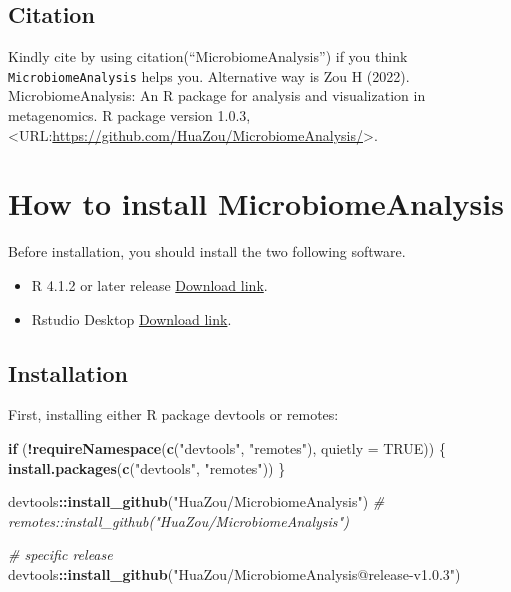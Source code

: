 \documentclass[
]{book}
\newenvironment{Shaded}{\begin{snugshade}}{\end{snugshade}}
\newcommand{\AttributeTok}[1]{\textcolor[rgb]{0.13,0.29,0.53}{#1}}
\newcommand{\CommentTok}[1]{\textcolor[rgb]{0.56,0.35,0.01}{\textit{#1}}}
\newcommand{\ConstantTok}[1]{\textcolor[rgb]{0.56,0.35,0.01}{#1}}
\newcommand{\ControlFlowTok}[1]{\textcolor[rgb]{0.13,0.29,0.53}{\textbf{#1}}}
\newcommand{\FunctionTok}[1]{\textcolor[rgb]{0.13,0.29,0.53}{\textbf{#1}}}
\newcommand{\NormalTok}[1]{#1}
\newcommand{\SpecialCharTok}[1]{\textcolor[rgb]{0.81,0.36,0.00}{\textbf{#1}}}
\newcommand{\StringTok}[1]{\textcolor[rgb]{0.31,0.60,0.02}{#1}}
\begin{document}
\hypertarget{citation}{%
\section{Citation}\label{citation}}

Kindly cite by using citation(``MicrobiomeAnalysis'') if you think \texttt{MicrobiomeAnalysis} helps you. Alternative way is Zou H (2022). MicrobiomeAnalysis: An R package for analysis and visualization in metagenomics. R package version 1.0.3, \textless URL:\url{https://github.com/HuaZou/MicrobiomeAnalysis/}\textgreater.

\hypertarget{how-to-install-microbiomeanalysis}{%
\chapter{How to install MicrobiomeAnalysis}\label{how-to-install-microbiomeanalysis}}

Before installation, you should install the two following software.

\begin{itemize}
\item
  R 4.1.2 \citep{R-base} or later release \href{https://mirrors.tuna.tsinghua.edu.cn/CRAN/}{Download link}.
\item
  Rstudio Desktop \href{https://www.rstudio.com/products/rstudio/download/\#download}{Download link}.
\end{itemize}

\hypertarget{installation}{%
\section{Installation}\label{installation}}

First, installing either R package devtools or remotes:

\begin{Shaded}
\begin{Highlighting}[]
\ControlFlowTok{if}\NormalTok{ (}\SpecialCharTok{!}\FunctionTok{requireNamespace}\NormalTok{(}\FunctionTok{c}\NormalTok{(}\StringTok{"devtools"}\NormalTok{, }\StringTok{"remotes"}\NormalTok{), }\AttributeTok{quietly =} \ConstantTok{TRUE}\NormalTok{)) \{}
  \FunctionTok{install.packages}\NormalTok{(}\FunctionTok{c}\NormalTok{(}\StringTok{"devtools"}\NormalTok{, }\StringTok{"remotes"}\NormalTok{))}
\NormalTok{\}}

\NormalTok{devtools}\SpecialCharTok{::}\FunctionTok{install\_github}\NormalTok{(}\StringTok{"HuaZou/MicrobiomeAnalysis"}\NormalTok{)}
\CommentTok{\# remotes::install\_github("HuaZou/MicrobiomeAnalysis")}

\CommentTok{\# specific release}
\NormalTok{devtools}\SpecialCharTok{::}\FunctionTok{install\_github}\NormalTok{(}\StringTok{"HuaZou/MicrobiomeAnalysis@release{-}v1.0.3"}\NormalTok{)}
\end{Highlighting}
\end{Shaded}
\end{document}
